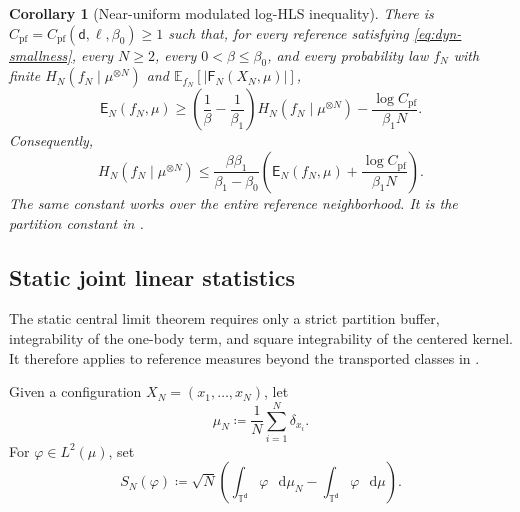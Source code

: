 \documentclass[11pt,reqno]{amsart}
\numberwithin{equation}{section}
\theoremstyle{plain}
\newtheorem{cor}[cor]{Corollary}
\theoremstyle{definition}
\renewcommand{\d}{\mathsf d}
\newcommand{\dd}{\mathop{}\!\mathrm d}
\newcommand{\T}{\mathbb T}
\newcommand{\E}{\mathbb E}
\newcommand{\be}{\beta}
\newcommand{\Fr}{\mathsf F}
\newcommand{\Er}{\mathsf E}
\newcommand{\XN}{X_N}
\begin{document}
\begin{cor}[Near-uniform modulated log-HLS inequality]
\label{cor:modulated-log-hls}
There is $C_{\mathrm{pf}}=C_{\mathrm{pf}}(\d,\ell,\be_0)\geq1$ such that, for every reference satisfying \eqref{eq:dyn-smallness}, every $N\geq2$, every $0<\be\leq\be_0$, and every probability law $f_N$ with finite $H_N(f_N\mid\mu^{\otimes N})$ and $\E_{f_N}[|\Fr_N(X_N,\mu)|]$,
\begin{equation}
 \Er_N(f_N,\mu)
 \geq\left(\frac1\be-\frac1{\be_1}\right)H_N(f_N\mid\mu^{\otimes N})
 -\frac{\log C_{\mathrm{pf}}}{\be_1N}.
 \label{eq:dyn-coercivity}
\end{equation}
Consequently,
\begin{equation}
 H_N(f_N\mid\mu^{\otimes N})
 \leq\frac{\be\be_1}{\be_1-\be_0}
 \left(\Er_N(f_N,\mu)+\frac{\log C_{\mathrm{pf}}}{\be_1N}\right).
 \label{eq:dyn-entropy-beta}
\end{equation}
The same constant works over the entire reference neighborhood. It is the partition constant in .
\end{cor}



\subsection{Static joint linear statistics}
\label{subsec:static-clt-introduction}

The static central limit theorem requires only a strict partition buffer, integrability of the one-body term, and square integrability of the centered kernel. It therefore applies to reference measures beyond the transported classes in .

Given a configuration $\XN=(x_1,\ldots,x_N)$, let
\begin{equation}
 \mu_N\coloneqq\frac1N\sum_{i=1}^N\delta_{x_i}.
 \label{eq:empirical-measure}
\end{equation}
For $\varphi\in L^2(\mu)$, set
\begin{equation}
 S_N(\varphi)
 \coloneqq\sqrt N\left(\int_{\T^{\d}}\varphi\,\dd\mu_N
 -\int_{\T^{\d}}\varphi\,\dd\mu\right).
 \label{eq:linear-statistic}
\end{equation}
\end{document}
